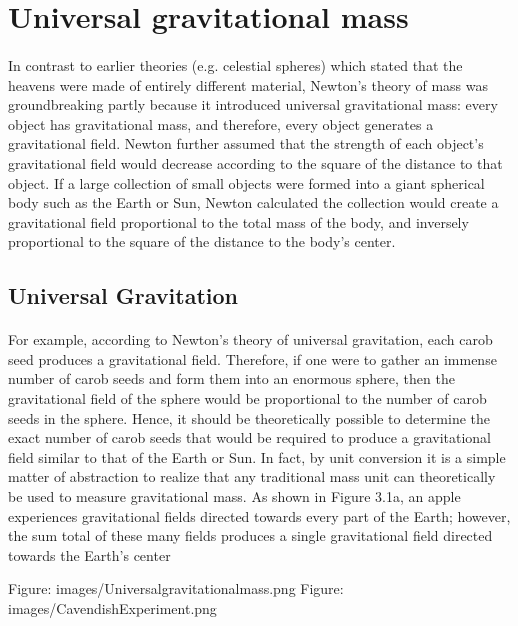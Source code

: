 \documentclass{book}
\begin{document}
	\section{Universal gravitational mass}
	\paragraph{}
	In contrast to earlier theories (e.g. celestial spheres) which stated that the heavens were made of entirely different material, Newton's theory of mass was groundbreaking partly because it introduced universal gravitational mass: every object has gravitational mass, and therefore, every object generates a gravitational field. Newton further assumed that the strength of each object's gravitational field would decrease according to the square of the distance to that object. If a large collection of small objects were formed into a giant spherical body such as the Earth or Sun, Newton calculated the collection would create a gravitational field proportional to the total mass of the body, and inversely proportional to the square of the distance to the body's center.
	
	\subsection{Universal Gravitation}
	\paragraph{}
	For example, according to Newton's theory of universal gravitation, each carob seed produces a gravitational field. Therefore, if one were to gather an immense number of carob seeds and form them into an enormous sphere, then the gravitational field of the sphere would be proportional to the number of carob seeds in the sphere. Hence, it should be theoretically possible to determine the exact number of carob seeds that would be required to produce a gravitational field similar to that of the Earth or Sun. In fact, by unit conversion it is a simple matter of abstraction to realize that any traditional mass unit can theoretically be used to measure gravitational mass. As shown in Figure 3.1a, an apple experiences gravitational fields directed towards every part of the Earth; however, the sum total of these many fields produces a single gravitational field directed towards the Earth's center
	
	Figure: images/Universalgravitationalmass.png
	Figure: images/CavendishExperiment.png
	
\end{document}
